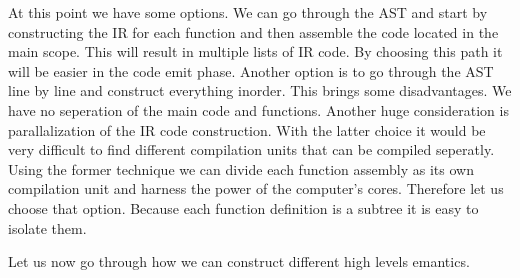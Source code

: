 At this point we have some options. We can go through the AST and start by constructing the IR for each function and then assemble the code located in the main scope. This will result in multiple lists of IR code. By choosing this path it will be easier in the code emit phase. Another option is to go through the AST line by line and construct everything inorder. This brings some disadvantages. We have no seperation of the main code and functions. Another huge consideration is parallalization of the IR code construction. With the latter choice it would be very difficult to find different compilation units that can be compiled seperatly. Using the former technique we can divide each function assembly as its own compilation unit and harness the power of the computer's cores. Therefore let us choose that option. Because each function definition is a subtree it is easy to isolate them. 

Let us now go through how we can construct different high levels emantics. 

